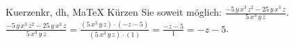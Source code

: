 \begin{MAufgabe}{Kuerzen}{kr, dh, MaTeX}
K\"urzen Sie soweit m\"oglich: $\frac{ - 5\, y\, x^3\, z^2 - 25\, y\, x^3\, z}{5\, x^3\, y\, z}$.\\ 
\ifLsg\MLoesung
\quad $\frac{ - 5\, y\, x^3\, z^2 - 25\, y\, x^3\, z}{5\, x^3\, y\, z}=\frac{(5\, x^3\, y\, z)\cdot( - z - 5)}{(5\, x^3\, y\, z)\cdot(1)}=\frac{ - z - 5}{1}= - z - 5$.\else\relax\fi
 \end{MAufgabe}